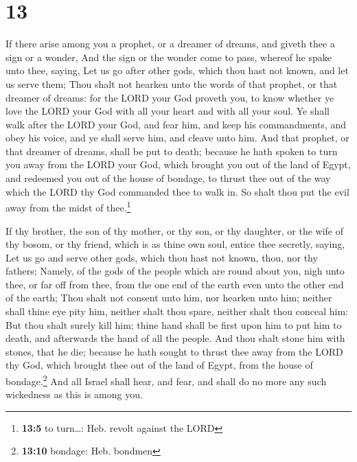 \hypertarget{section-12}{%
\section{13}\label{section-12}}

 If there arise among you a prophet, or a dreamer of
dreams, and giveth thee a sign or a wonder,  And the sign
or the wonder come to pass, whereof he spake unto thee, saying, Let us
go after other gods, which thou hast not known, and let us serve them;
 Thou shalt not hearken unto the words of that prophet, or
that dreamer of dreams: for the LORD your God proveth you, to know
whether ye love the LORD your God with all your heart and with all your
soul.  Ye shall walk after the LORD your God, and fear
him, and keep his commandments, and obey his voice, and ye shall serve
him, and cleave unto him.  And that prophet, or that
dreamer of dreams, shall be put to death; because he hath spoken to turn
you away from the LORD your God, which brought you out of the land of
Egypt, and redeemed you out of the house of bondage, to thrust thee out
of the way which the LORD thy God commanded thee to walk in. So shalt
thou put the evil away from the midst of thee.\footnote{\textbf{13:5} to
  turn\ldots: Heb. revolt against the LORD}

 If thy brother, the son of thy mother, or thy son, or thy
daughter, or the wife of thy bosom, or thy friend, which is as thine own
soul, entice thee secretly, saying, Let us go and serve other gods,
which thou hast not known, thou, nor thy fathers;  Namely,
of the gods of the people which are round about you, nigh unto thee, or
far off from thee, from the one end of the earth even unto the other end
of the earth;  Thou shalt not consent unto him, nor
hearken unto him; neither shall thine eye pity him, neither shalt thou
spare, neither shalt thou conceal him:  But thou shalt
surely kill him; thine hand shall be first upon him to put him to death,
and afterwards the hand of all the people.  And thou
shalt stone him with stones, that he die; because he hath sought to
thrust thee away from the LORD thy God, which brought thee out of the
land of Egypt, from the house of bondage.\footnote{\textbf{13:10}
  bondage: Heb. bondmen}  And all Israel shall hear, and
fear, and shall do no more any such wickedness as this is among you.

